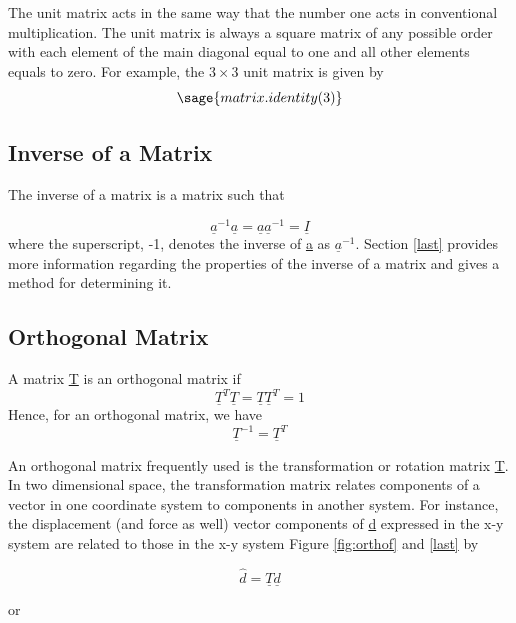 \documentclass[12pt]{report}
\begin{document}
The unit matrix acts in the same way that the number one acts in
conventional multiplication. The unit matrix is always a square matrix
of any possible order with each element of the main diagonal equal to
one and all other elements equals to zero. For example, the $3 \times 3$
unit matrix is given by
\begin{equation}\sage{matrix.identity(3)}\end{equation}

\subsection{Inverse of a Matrix}

The inverse of a matrix is a matrix such that

\begin{equation}\underline{a}^{-1}\underline{a}=\underline{a}\underline{a}^{-1}=\underline{I}\end{equation}
where the superscript, -1, denotes the inverse of \underline{a} as $\underline{a}^{-1}$.
Section \ref{last} provides more information regarding the properties of the
inverse of a matrix and gives a method for determining it.

\subsection{Orthogonal Matrix}
A matrix \underline{T} is an orthogonal matrix if
\begin{equation}\underline{T}^T\underline{T} = \underline{T}\underline{T}^T=1\end{equation}
Hence, for an orthogonal matrix, we have
\begin{equation}\underline{T}^{-1}=\underline{T}^T\end{equation}

An orthogonal matrix frequently used is the transformation or rotation
matrix \underline{T}. In two dimensional space, the transformation matrix
relates components of a vector in one coordinate system to components
in another system. For instance, the displacement (and force as well)
vector components of \underline{d} expressed in the x-y system are related to
those in the x-y system Figure \ref{fig:orthof} and \ref{last} by

\begin{equation}\hat{d}=\underline{T}\underline{d}\end{equation}


or
\end{document}

